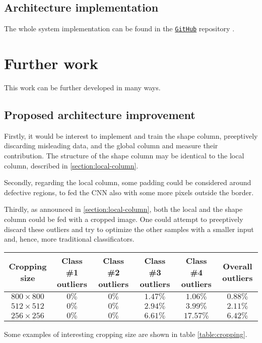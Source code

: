     \subsection{Architecture implementation}
    \par{
        The whole system implementation can be found in the \href{https://github.com/antonioterpin/wavelet_ml}{\texttt{GitHub}} repository \cite{antonioterpin:github}.
    }

\section{Further work}\label{section:further-work}
    \par{
        This work can be further developed in many ways.
    }
    \subsection{Proposed architecture improvement}
    \par{
        Firstly, it would be interest to implement and train the shape column, preeptively discarding misleading data, and the global column and measure their contribution. The structure of the shape column may be identical to the local column, described in \ref{section:local-column}.
    }
    \par{
        Secondly, regarding the local column, some padding could be considered around defective regions, to fed the CNN also with some more pixels outside the border.
    }
    \par{
        Thirdly, as announced in \ref{section:local-column}, both the local and the shape column could be fed with a cropped image. One could attempt to preeptively discard these outliers and try to optimize the other samples with a smaller input and, hence, more traditional classificators.
    }
    \begin{table*}
        \centering
        \begin{tabular}{|c|c|c|c|c|c|}
            \hline
            \textbf{Cropping size} & \textbf{Class \#1 outliers} & \textbf{Class \#2 outliers}& \textbf{Class \#3 outliers} & \textbf{Class \#4 outliers} & \textbf{Overall outliers}\\\hline
            $800\times 800$ & $0\%$ & $0\%$ & $1.47\%$ & $1.06\%$ & $0.88\%$\\
            $512\times 512$ & $0\%$ & $0\%$ & $2.94\%$ & $3.99\%$ & $2.11\%$\\
            $256\times 256$ & $0\%$ & $0\%$ & $6.61\%$ & $17.57\%$& $6.42\%$\\
            \hline
        \end{tabular}
        \vspace{0.5cm}
        \caption{Cropping examples.}\label{table:cropping}
    \end{table*}
    \par{
        Some examples of interesting cropping size are shown in table \ref{table:cropping}.
    }
